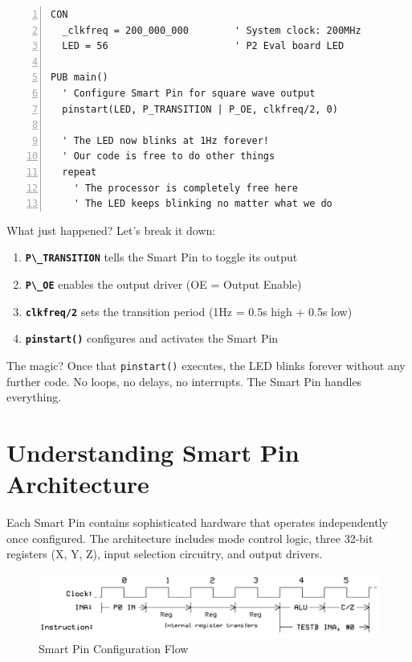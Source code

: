 \documentclass[11pt,a4paper,oneside,english]{book}
\begin{document}
\begin{Spin2Block}
\begin{Verbatim}[numbers=left,numbersep=5pt,xleftmargin=15pt]
CON
  _clkfreq = 200_000_000        ' System clock: 200MHz
  LED = 56                      ' P2 Eval board LED

PUB main()
  ' Configure Smart Pin for square wave output
  pinstart(LED, P_TRANSITION | P_OE, clkfreq/2, 0)
  
  ' The LED now blinks at 1Hz forever!
  ' Our code is free to do other things
  repeat
    ' The processor is completely free here
    ' The LED keeps blinking no matter what we do
\end{Verbatim}
\end{Spin2Block}

What just happened? Let's break it down:

\begin{enumerate}
\def\labelenumi{\arabic{enumi}.}
\tightlist
\item
  \textbf{\passthrough{\lstinline!P\_TRANSITION!}} tells the Smart Pin
  to toggle its output
\item
  \textbf{\passthrough{\lstinline!P\_OE!}} enables the output driver (OE
  = Output Enable)
\item
  \textbf{\passthrough{\lstinline!clkfreq/2!}} sets the transition
  period (1Hz = 0.5s high + 0.5s low)
\item
  \textbf{\passthrough{\lstinline!pinstart()!}} configures and activates
  the Smart Pin
\end{enumerate}

The magic? Once that \passthrough{\lstinline!pinstart()!} executes, the
LED blinks forever without any further code. No loops, no delays, no
interrupts. The Smart Pin handles everything.

\hypertarget{understanding-smart-pin-architecture}{%
\section{Understanding Smart Pin
Architecture}\label{understanding-smart-pin-architecture}}

Each Smart Pin contains sophisticated hardware that operates
independently once configured. The architecture includes mode control
logic, three 32-bit registers (X, Y, Z), input selection circuitry, and
output drivers.

\begin{figure}
\centering
\includegraphics{assets/P2 SmartPins-220809_page04_img01.png}
\caption{Smart Pin Configuration Flow}
\end{figure}
\end{document}
